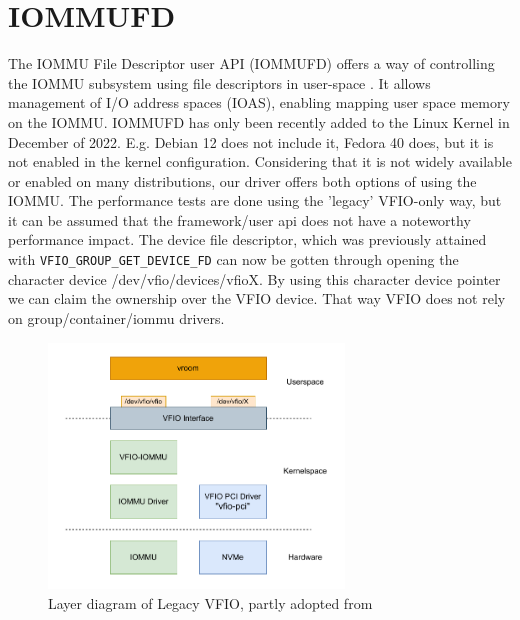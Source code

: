 \section{IOMMUFD}
The IOMMU File Descriptor user API (IOMMUFD) offers a way of controlling the IOMMU subsystem using file descriptors in user-space \cite{iommufdkerneldocs}.
It allows management of I/O address spaces (IOAS), enabling mapping user space memory on the IOMMU.
IOMMUFD has only been recently added to the Linux Kernel in December of 2022. E.g. Debian 12 does not include it, Fedora 40 does, but it is not enabled in the kernel configuration. Considering that it is not widely available or enabled on many distributions, our driver offers both options of using the IOMMU. The performance tests are done using the 'legacy' VFIO-only way, but it can be assumed that the framework/user api does not have a noteworthy performance impact.
The device file descriptor, which was previously attained with \texttt{VFIO\_GROUP\_GET\_DEVICE\_FD} can now be gotten through opening the character device /dev/vfio/devices/vfioX.
By using this character device pointer we can claim the ownership over the VFIO device. That way VFIO does not rely on group/container/iommu drivers.

\begin{figure}
    \centering
    \includegraphics[width=0.7\textwidth]{figures/VFIOLayer.pdf}
    \caption{Layer diagram of Legacy VFIO, partly adopted from \cite{dpdkiommufd}}
    \label{fig:vfio-layer}
\end{figure}

